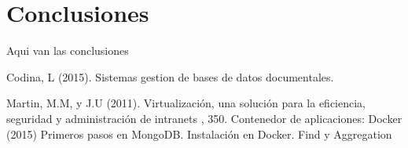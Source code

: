 \documentclass[twoside,twocolumn]{article}
\begin{document}

\section{Conclusiones}

Aqui van las conclusiones



\begin{thebibliography}{99} 
Codina, L (2015).
\newblock Sistemas gestion de bases de datos documentales.


Martin, M.M,  y J.U (2011).
\newblock Virtualización, una solución para la eficiencia,
seguridad y administración de intranets
, 350.
\newblock Contenedor de aplicaciones: Docker (2015)
\newblock Primeros pasos en MongoDB. Instalación en Docker. Find y Aggregation
 
 
\end{thebibliography}

\end{document}
